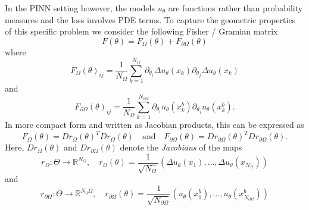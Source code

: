 In the PINN setting however, the models $u_\theta$ are functions rather than probability measures %
and the loss involves PDE terms.
To capture the geometric properties of this specific problem we consider the following Fisher / Gramian matrix %
\begin{equation*}
  F(\theta) = F_\Omega(\theta) + F_{\partial\Omega}(\theta)
\end{equation*}
where
\begin{equation}\label{eq:FisherInterior}
  F_\Omega(\theta)_{ij} = \frac1{{N_\Omega}} \sum_{k=1}^{N_\Omega} \partial_{\theta_i} \Delta u_\theta(x_k) \partial_{\theta_j} \Delta u_\theta(x_k)
\end{equation}
and
\begin{equation}
  F_{\partial\Omega}(\theta)_{ij} = \frac1{{N_\Omega}} \sum_{k=1}^{N_{\partial\Omega}} \partial_{\theta_i} u_\theta(x_k^b) \partial_{\theta_j} u_\theta (x_k^b).
\end{equation}
In more compact form and written as Jacobian products, this can be expressed as
\begin{equation}\label{eq:Jacobian_Fischer}
  F_\Omega(\theta) = Dr_\Omega(\theta)^T Dr_\Omega(\theta)
  \quad \text{and} \quad
  F_{\partial\Omega}(\theta) = Dr_{\partial\Omega}(\theta)^T Dr_{\partial\Omega}(\theta).
\end{equation}
Here, $Dr_\Omega(\theta)$ and $Dr_{\partial\Omega}(\theta)$  denote the \emph{Jacobians} of the maps
\begin{equation*}
  r_{\Omega}\colon \Theta \to \mathbb{R}^{N_\Omega}, \quad r_{\Omega}(\theta) = \frac{1}{\sqrt{N_{\Omega}}}(\Delta u_\theta(x_1), \dots, \Delta u_\theta(x_{N_{\Omega}}))
\end{equation*}
and
\begin{equation*}
  r_{\partial\Omega}\colon \Theta \to \mathbb{R}^{{N_\partial\Omega}}, \quad r_{\partial\Omega}(\theta) = \frac{1}{\sqrt{N_{\partial\Omega}}}(u_\theta(x^b_1), \dots, u_\theta(x^b_{N_{\partial\Omega}}))
\end{equation*}

